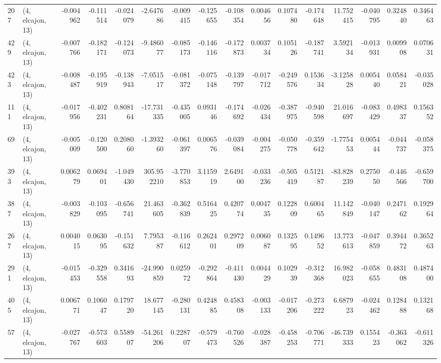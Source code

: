 \begin{tabular}{llrrrrrrrrrrrrrr}
207 &  (4, elcajon, 13) &  -0.004962 & -0.111514 & -0.024079 &   -2.647686 & -0.009415 &  -0.125655 & -0.108354 &  0.004656 &  0.107480 & -0.174648 &    11.752415 & -0.040795 &  0.324840 &  0.346463 \\
429 &  (4, elcajon, 13) &  -0.007766 & -0.182171 & -0.124073 &   -9.486077 & -0.085173 &  -0.146116 & -0.172873 &  0.003734 &  0.105126 & -0.187741 &     3.592134 & -0.013931 &  0.009908 &  0.070631 \\
423 &  (4, elcajon, 13) &  -0.008487 & -0.195919 & -0.138943 &   -7.051517 & -0.081372 &  -0.075148 & -0.139797 & -0.017712 & -0.249576 &  0.153634 &    -3.125828 &  0.005440 &  0.058421 & -0.035028 \\
111 &  (4, elcajon, 13) &  -0.017956 & -0.402231 &  0.808164 &  -17.731335 & -0.435005 &   0.093146 & -0.174692 & -0.026434 & -0.387975 & -0.940598 &    21.016697 & -0.083429 &  0.498337 &  0.156352 \\
69  &  (4, elcajon, 13) &  -0.005009 & -0.120500 &  0.208060 &   -1.393260 & -0.061397 &   0.006576 & -0.039084 & -0.004275 & -0.050778 & -0.359642 &    -1.775453 &  0.005444 & -0.044737 & -0.058375 \\
393 &  (4, elcajon, 13) &   0.006279 &  0.069401 & -1.049430 &  305.952210 & -3.770853 &   3.115919 &  2.649100 & -0.033236 & -0.505419 &  0.512187 &   -83.828239 &  0.275050 & -0.446566 & -0.659700 \\
387 &  (4, elcajon, 13) &  -0.003829 & -0.103095 & -0.656741 &   21.463605 & -0.362839 &   0.516425 &  0.420774 &  0.004735 &  0.122809 &  0.600465 &    11.142849 & -0.040147 &  0.247162 &  0.192964 \\
267 &  (4, elcajon, 13) &   0.004015 &  0.063095 & -0.151632 &    7.795387 & -0.116612 &   0.262401 &  0.297209 &  0.006087 &  0.132595 &  0.149652 &    13.773613 & -0.047859 &  0.394472 &  0.365263 \\
291 &  (4, elcajon, 13) &  -0.015453 & -0.329558 &  0.341693 &  -24.990859 &  0.025972 &  -0.292864 & -0.411430 &  0.004429 &  0.102939 & -0.312368 &    16.982023 & -0.058655 &  0.483108 &  0.487400 \\
405 &  (4, elcajon, 13) &   0.006771 &  0.106047 &  0.179720 &   18.677145 & -0.280131 &   0.424885 &  0.458308 & -0.003133 & -0.017206 & -0.273222 &     6.687923 & -0.024462 &  0.128488 &  0.132168 \\
57  &  (4, elcajon, 13) &  -0.027767 & -0.573603 &  0.558907 &  -54.261206 &  0.228707 &  -0.579473 & -0.760526 & -0.028387 & -0.458253 & -0.706771 &   -46.739333 &  0.155423 & -0.363062 & -0.611326 \\

\end{tabular}
